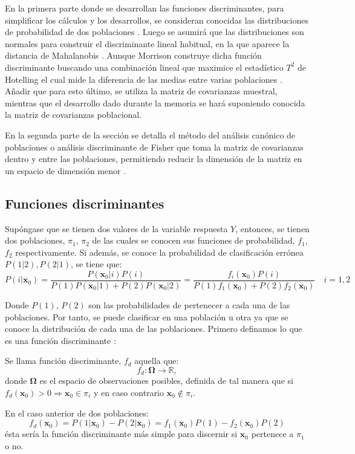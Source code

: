 \noindent En la primera parte donde se desarrollan las funciones discriminantes, para simplificar los cálculos y los desarrollos, se consideran conocidas las distribuciones de probabilidad de dos poblaciones \cite{Johnson 2007}. Luego se asumirá que las distribuciones son normales para construir el discriminante lineal habitual, en la que aparece la distancia de Mahalanobis \cite{Peña 2002}. Aunque Morrison  construye dicha función discriminante buscando una combinación lineal que maximice el estadístico $T^2$ de Hotelling el cual mide la diferencia de las medias entre varias poblaciones \cite{ Johnson 2007, Mardia 1979, Morrison 1976}. Añadir que para esto último, se utiliza la matriz de covarianzas muestral, mientras que el desarrollo dado durante la memoria se hará suponiendo conocida la matriz de covarianzas poblacional.  

\noindent En la segunda parte de la sección se detalla el método del análisis canónico de poblaciones o análisis discriminante de Fisher que toma la matriz de covarianzas dentro y entre las poblaciones, permitiendo reducir la dimensión de la matriz en un espacio de dimensión menor \cite{Lebart 1984}. 

\subsection{Funciones discriminantes}

\noindent Supóngase que se tienen dos valores de la variable respuesta $Y$, entonces, se tienen dos poblaciones, $\pi_1$, $\pi_2$ de las cuales se conocen sus funciones de probabilidad, $f_1$, $f_2$ respectivamente. Si además, se conoce la probabilidad de clasificación errónea $P(1|2),P(2|1)$, se tiene que:
\begin{equation}
P(i|\textbf{x}_0)=\dfrac{P(\textbf{x}_0|i)P(i)}{P(1)P(\textbf{x}_0|1)+P(2)P(\textbf{x}_0|2)}=\dfrac{f_i(\mathbf{x}_0)P(i)}{P(1)f_1(\mathbf{x}_0)+P(2)f_2(\mathbf{x}_0)} \quad i=1,2
\end{equation}

\noindent Donde $P(1)$, $P(2)$ son las probabilidades de pertenecer a cada una de las poblaciones. Por tanto, se puede clasificar en una población u otra ya que se conoce la distribución de cada una de las poblaciones. Primero definamos lo que es una función discriminante \cite{Cuadras 2014}:

\begin{defi}
Se llama función discriminante, $f_{d}$ aquella que:
\begin{equation}
f_{d}:\mathbf{\Omega}\longrightarrow \mathbb{R},
\end{equation}
donde $\mathbf{\Omega}$ es el espacio de observaciones posibles, definida de tal manera que si $f_{d}(\textbf{x}_0)>0\Rightarrow \textbf{x}_0\in \pi_i$ y en caso contrario $\textbf{x}_0\notin \pi_i$. 
\end{defi}
\noindent En el caso anterior de dos poblaciones:
\begin{equation}
 f_d(\mathbf{x}_0)=P(1|\mathbf{x}_0)-P(2|\mathbf{x}_0)=f_1(\textbf{x}_0)P(1)-f_2(\textbf{x}_0)P(2)
\end{equation} 
ésta sería la función discriminante más simple  para discernir si $\textbf{x}_0$ pertenece a $\pi_1$ o no.

